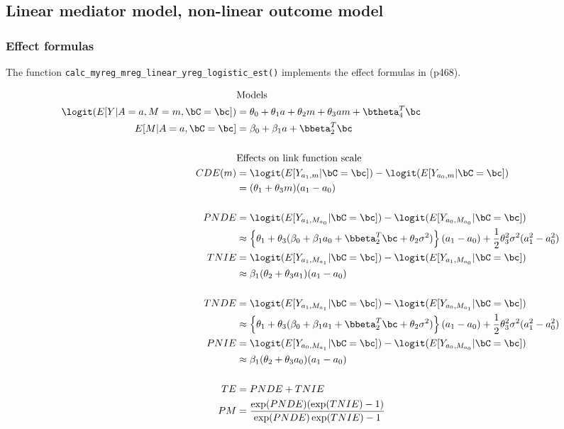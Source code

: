 \documentclass[dvipdfmx,10pt]{article}
\begin{document}
\subsection{Linear mediator model, non-linear outcome model}
\label{sec:org24b2a96}
\subsubsection{Effect formulas}
\label{sec:org4c72bb3}
The function \texttt{calc\_myreg\_mreg\_linear\_yreg\_logistic\_est()} implements the effect formulas in \cite{vanderweeleExplanationCausalInference2015} (p468).

\begin{align*}
  &\text{Models}\\
  \logit(E[Y|A=a,M=m,\bC=\bc]) &= \theta_{0} + \theta_{1}a + \theta_{2}m + \theta_{3}am + \btheta_{4}^{T}\bc\\
  E[M|A=a,\bC=\bc] &= \beta_{0} + \beta_{1}a + \bbeta_{2}^{T}\bc\\
  \\
  &\text{Effects on link function scale}\\
  CDE(m) &= \logit(E[Y_{a_{1},m} | \bC = \bc]) - \logit(E[Y_{a_{0},m} | \bC = \bc])\\
  &= (\theta_{1} + \theta_{3}m)(a_{1} - a_{0})\\
  \\
  PNDE &= \logit(E[Y_{a_{1},M_{a_{0}}} | \bC = \bc]) - \logit(E[Y_{a_{0},M_{a_{0}}} | \bC = \bc])\\
  &\approx \left\{ \theta_{1} + \theta_{3}(\beta_{0} + \beta_{1}a_{0} + \bbeta_{2}^{T}\bc + \theta_{2}\sigma^{2}) \right\} (a_{1} - a_{0}) + \frac{1}{2} \theta_{3}^{2}\sigma^{2}(a_{1}^{2} - a_{0}^{2})\\
  TNIE &= \logit(E[Y_{a_{1},M_{a_{1}}} | \bC = \bc]) - \logit(E[Y_{a_{1},M_{a_{0}}} | \bC = \bc])\\
  &\approx \beta_{1}(\theta_{2} + \theta_{3}a_{1})(a_{1} - a_{0})\\
  \\
  TNDE &= \logit(E[Y_{a_{1},M_{a_{1}}} | \bC = \bc]) - \logit(E[Y_{a_{0},M_{a_{1}}} | \bC = \bc])\\
  &\approx \left\{ \theta_{1} + \theta_{3}(\beta_{0} + \beta_{1}a_{1} + \bbeta_{2}^{T}\bc + \theta_{2}\sigma^{2}) \right\} (a_{1} - a_{0}) + \frac{1}{2} \theta_{3}^{2}\sigma^{2}(a_{1}^{2} - a_{0}^{2})\\
  PNIE &= \logit(E[Y_{a_{0},M_{a_{1}}} | \bC = \bc]) - \logit(E[Y_{a_{0},M_{a_{0}}} | \bC = \bc])\\
  &\approx \beta_{1}(\theta_{2} + \theta_{3}a_{0})(a_{1} - a_{0})\\
  \\
  TE &= PNDE + TNIE\\
  PM &= \frac{\exp(PNDE)(\exp(TNIE) - 1)}{\exp(PNDE)\exp(TNIE) - 1}\\
\end{align*}
\end{document}
